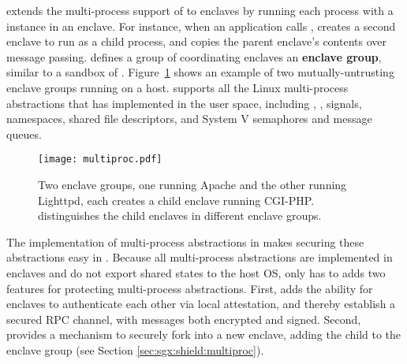 
\graphenesgx{} extends the multi-process support of \graphene{} to enclaves by running each
process with a \libos{} instance in an enclave.
For instance, when an application calls , \graphenesgx{} creates a second enclave to run as a child process,
and copies the parent enclave's contents over message passing.
\graphenesgx{} defines
a group of coordinating enclaves an {\bf enclave group},
similar to a sandbox of \graphene{}.
Figure~\ref{fig:sgx:enclave-groups} shows an example of two mutually-untrusting enclave groups running on a host.
\graphenesgx{} supports all the Linux multi-process abstractions that \graphene{} has implemented in the user space,
including , , signals, namespaces, shared file descriptors, and System V semaphores and message queues.


\begin{figure}[t!]
\centering
\texttt{[image: multiproc.pdf]}
\caption{Two enclave groups, one running Apache and the other running Lighttpd, each creates a child enclave running CGI-PHP.
\graphenesgx{} distinguishes the child enclaves in different enclave groups.}
\label{fig:sgx:enclave-groups}
\end{figure}



The implementation of multi-process abstractions in \graphene{}
makes securing these abstractions easy in \graphenesgx{}.
Because all multi-process abstractions are implemented in enclaves and
do not export shared states to the host OS,
\graphenesgx{} only has to adds two features for protecting multi-process abstractions.
First, \graphenesgx{} adds
the ability for enclaves to authenticate each other via local attestation,
and thereby establish a secured RPC channel,
with messages both encrypted and signed.
Second, \graphenesgx{} provides
a mechanism to securely fork into a new enclave, adding the child to the enclave group (see Section \ref{sec:sgx:shield:multiproc}).





